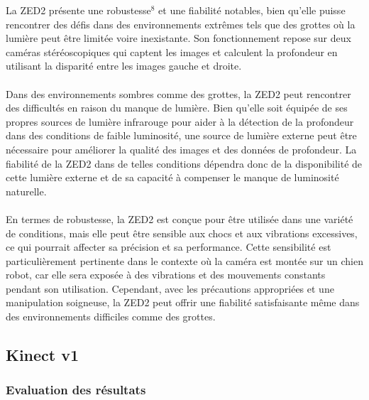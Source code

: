             \normalsize{
                La ZED2 présente une robustesse$^8$ et une fiabilité notables, bien qu'elle puisse rencontrer des défis dans des environnements extrêmes tels que des grottes où la lumière peut être limitée voire inexistante. Son fonctionnement repose sur deux caméras stéréoscopiques qui captent les images et calculent la profondeur en utilisant la disparité entre les images gauche et droite.
            }
            \\ \\
            \normalsize{
                Dans des environnements sombres comme des grottes, la ZED2 peut rencontrer des difficultés en raison du manque de lumière. Bien qu'elle soit équipée de ses propres sources de lumière infrarouge pour aider à la détection de la profondeur dans des conditions de faible luminosité, une source de lumière externe peut être nécessaire pour améliorer la qualité des images et des données de profondeur. La fiabilité de la ZED2 dans de telles conditions dépendra donc de la disponibilité de cette lumière externe et de sa capacité à compenser le manque de luminosité naturelle.
            }
            \\ \\
            \normalsize{
                En termes de robustesse, la ZED2 est conçue pour être utilisée dans une variété de conditions, mais elle peut être sensible aux chocs et aux vibrations excessives, ce qui pourrait affecter sa précision et sa performance. Cette sensibilité est particulièrement pertinente dans le contexte où la caméra est montée sur un chien robot, car elle sera exposée à des vibrations et des mouvements constants pendant son utilisation. Cependant, avec les précautions appropriées et une manipulation soigneuse, la ZED2 peut offrir une fiabilité satisfaisante même dans des environnements difficiles comme des grottes.
            }

\subsection{Kinect v1}

    \subsubsection{Evaluation des résultats}
    
